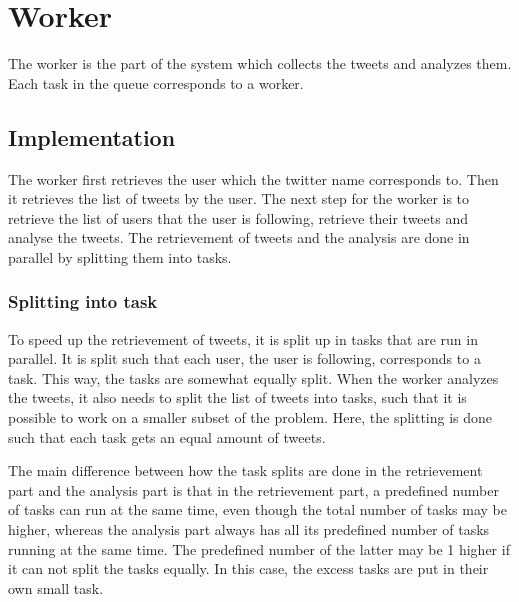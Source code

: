 \chapter{Worker}
The worker is the part of the system which collects the tweets and analyzes
them. Each task in the queue corresponds to a worker. 

\section{Implementation}
The worker first retrieves the user which the twitter name corresponds to. Then
it retrieves the list of tweets by the user. The next step for the
worker is to retrieve the list of users that the user is following, retrieve
their tweets and analyse the tweets. The retrievement of tweets and the
analysis are done in parallel by splitting them into tasks.

\subsection{Splitting into task}
To speed up the retrievement of tweets, it is split up in tasks that are run in
parallel. It is split such that each user, the user is following, corresponds
to a task. This way, the tasks are somewhat equally split. 
When the worker analyzes the tweets, it also needs to split the list of tweets
into tasks, such that it is possible to work on a smaller subset of the
problem. Here, the splitting is done such that each task gets an equal amount of
tweets.

The main difference between how the task splits are done in the retrievement
part and the analysis part is that in the retrievement part, a predefined number
of tasks can run at the same time, even though the total number of tasks may be
higher, whereas the analysis part always has all its predefined number of tasks
running at the same time. The predefined number of the latter may be 1 higher if
it can not split the tasks equally. In this case, the excess tasks are
put in their own small task.

